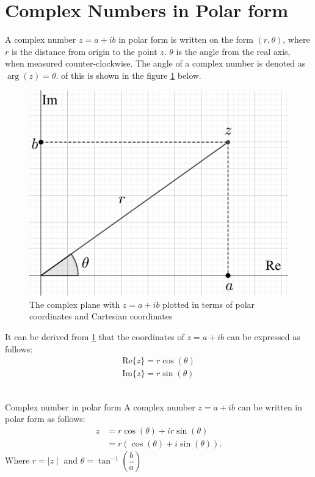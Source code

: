 \section{Complex Numbers in Polar form}
A complex number $z=a+ib$ in polar form is written on the form $(r,\theta)$, where $r$ is the distance from origin to the point $z$. $\theta$ is the angle from the real axis, when measured counter-clockwise. The angle of a complex number is denoted as $\arg(z)=\theta$.
of this is shown in the figure \ref{fig:complex_plane_polar} below.
\begin{figure}[H] 
\centering
\includegraphics[scale=0.15]{fig/img/complex_plan_polar}
\caption{The complex plane with $z=a+ib$ plotted in terms of polar coordinates and Cartesian coordinates}
\label{fig:complex_plane_polar}
\end{figure}
\noindent
It can be derived from \ref{fig:complex_plane_polar} that the coordinates of $z=a+ib$ can be expressed as follows:
\begin{align}
\text{Re}\{z\}=r\cos(\theta)
\\
\text{Im}\{z\}=r\sin(\theta)
\end{align}
\\
\begin{definition}{Complex number in polar form}{}
A complex number $z=a+ib$ can be written in polar form as follows:
\begin{align}
z&=r\cos(\theta)+ir\sin(\theta)
\\
&=r\left(\cos(\theta)+i\sin(\theta)\right).
\end{align}
Where $r=\mid z \mid$ and $\theta=\tan^{-1}\left(\dfrac{b}{a} \right)$
\end{definition}
